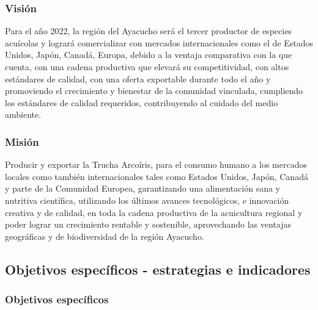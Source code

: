 \documentclass[
  stu,
  floatsintext,
  longtable,
  a4paper,
  nolmodern,
  notxfonts,
  notimes,
  12pt,
  colorlinks=true,linkcolor=blue,citecolor=blue,urlcolor=blue]{apa7}
\begin{document}
\subsubsection{Visión}\label{visiuxf3n}

Para el año 2022, la región del Ayacucho será el tercer productor de
especies acuícolas y logrará comercializar con mercados internacionales
como el de Estados Unidos, Japón, Canadá, Europa, debido a la ventaja
comparativa con la que cuenta, con una cadena productiva que elevará su
competitividad, con altos estándares de calidad, con una oferta
exportable durante todo el año y promoviendo el crecimiento y bienestar
de la comunidad vinculada, cumpliendo los estándares de calidad
requeridos, contribuyendo al cuidado del medio ambiente.

\subsubsection{Misión}\label{misiuxf3n}

Producir y exportar la Trucha Arcoíris, para el consumo humano a los
mercados locales como también internacionales tales como Estados Unidos,
Japón, Canadá y parte de la Comunidad Europea, garantizando una
alimentación sana y nutritiva científica, utilizando los últimos avances
tecnológicos, e innovación creativa y de calidad, en toda la cadena
productiva de la acuicultura regional y poder lograr un crecimiento
rentable y sostenible, aprovechando las ventajas geográficas y de
biodiversidad de la región Ayacucho.

\subsection{Objetivos específicos - estrategias e
indicadores}\label{objetivos-especuxedficos---estrategias-e-indicadores}

\subsubsection{Objetivos específicos}\label{objetivos-especuxedficos}
\end{document}

